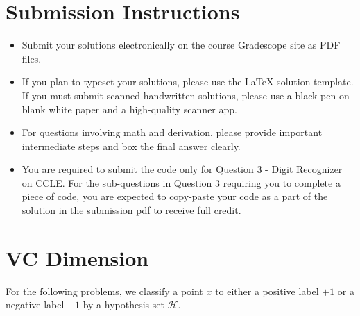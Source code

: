 \documentclass[11pt]{article}
\begin{document}
\author{}
\date{}
\maketitle
\vspace{-0.75in}



\ifsoln
\else
\section*{Submission Instructions}
\begin{itemize}
\item 
Submit your solutions electronically on the course Gradescope site as PDF files.
\item If you plan to typeset your solutions, please use the LaTeX solution template. If you must submit scanned handwritten solutions, please use a black pen on blank white paper and a high-quality scanner app.
\item For questions involving math and derivation, please provide important intermediate steps and box the final answer clearly.
\item You are required to submit the code only for Question 3 - Digit Recognizer on CCLE. For the sub-questions in Question 3 requiring you to complete a piece of code, you are expected to copy-paste your code as a part of the solution in the submission pdf to receive full credit.
\end{itemize}
\fi

\ifnotsolution{\newpage}
\section{VC Dimension }

For the following problems, we classify a point $x$ to either a positive label $+1$ or a negative label $-1$ by a hypothesis set $\mathcal{H}$.
\end{document}
